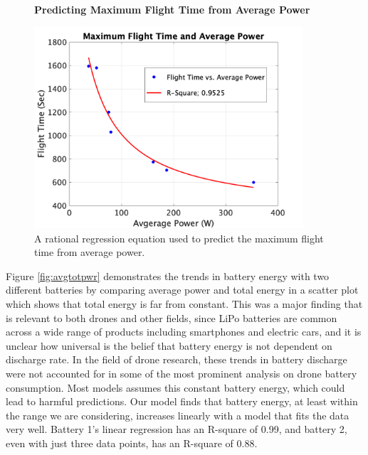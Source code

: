 \documentclass{article}
\begin{document}
\begin{figure}[!h]
  \centering
  \large{\textbf{Predicting Maximum Flight Time from Average Power}}\par
  \includegraphics[width = 100mm]{images/FlightTime.png}
  \caption{A rational regression equation used to predict the maximum flight time from average power.}
  \label{fig:flighttime}
\end{figure}

Figure \ref{fig:avgtotpwr} demonstrates the trends in battery energy with two different batteries by comparing average power and total energy in a scatter plot which shows that total energy is far from constant. This was a major finding that is relevant to both drones and other fields, since LiPo batteries are common across a wide range of products including smartphones and electric cars, and it is unclear how universal is the belief that battery energy is not dependent on discharge rate. In the field of drone research, these trends in battery discharge were not accounted for in some of the most prominent analysis on drone battery consumption. Most models assumes this constant battery energy, which could lead to harmful predictions. Our model finds that battery energy, at least within the range we are considering, increases linearly with a model that fits the data very well. Battery 1's linear regression has an R-square of 0.99, and battery 2, even with just three data points, has an R-square of 0.88.
\end{document}
